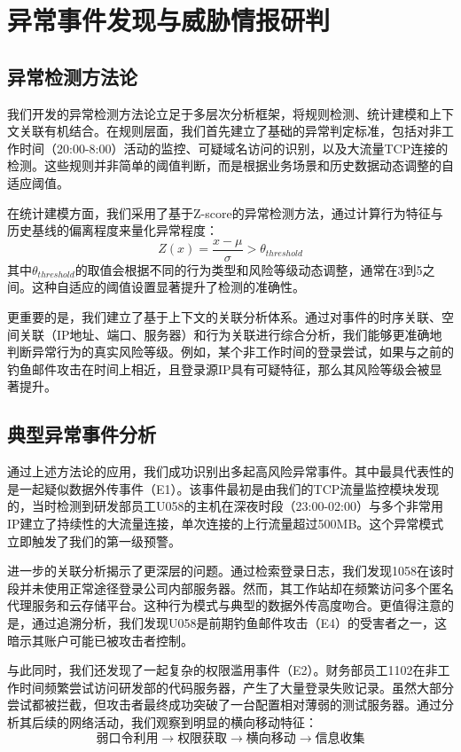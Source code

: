 \documentclass[UTF8,12pt]{ctexart}
\begin{document}
\section{异常事件发现与威胁情报研判}
\subsection{异常检测方法论}
我们开发的异常检测方法论立足于多层次分析框架，将规则检测、统计建模和上下文关联有机结合。在规则层面，我们首先建立了基础的异常判定标准，包括对非工作时间（20:00-8:00）活动的监控、可疑域名访问的识别，以及大流量TCP连接的检测。这些规则并非简单的阈值判断，而是根据业务场景和历史数据动态调整的自适应阈值。

在统计建模方面，我们采用了基于Z-score的异常检测方法，通过计算行为特征与历史基线的偏离程度来量化异常程度：
\begin{equation}
Z(x) = \frac{x - \mu}{\sigma} > \theta_{threshold}
\end{equation}
其中$\theta_{threshold}$的取值会根据不同的行为类型和风险等级动态调整，通常在3到5之间。这种自适应的阈值设置显著提升了检测的准确性。

更重要的是，我们建立了基于上下文的关联分析体系。通过对事件的时序关联、空间关联（IP地址、端口、服务器）和行为关联进行综合分析，我们能够更准确地判断异常行为的真实风险等级。例如，某个非工作时间的登录尝试，如果与之前的钓鱼邮件攻击在时间上相近，且登录源IP具有可疑特征，那么其风险等级会被显著提升。

\subsection{典型异常事件分析}
通过上述方法论的应用，我们成功识别出多起高风险异常事件。其中最具代表性的是一起疑似数据外传事件（E1）。该事件最初是由我们的TCP流量监控模块发现的，当时检测到研发部员工U058的主机在深夜时段（23:00-02:00）与多个非常用IP建立了持续性的大流量连接，单次连接的上行流量超过500MB。这个异常模式立即触发了我们的第一级预警。

进一步的关联分析揭示了更深层的问题。通过检索登录日志，我们发现1058在该时段并未使用正常途径登录公司内部服务器。然而，其工作站却在频繁访问多个匿名代理服务和云存储平台。这种行为模式与典型的数据外传高度吻合。更值得注意的是，通过追溯分析，我们发现U058是前期钓鱼邮件攻击（E4）的受害者之一，这暗示其账户可能已被攻击者控制。

与此同时，我们还发现了一起复杂的权限滥用事件（E2）。财务部员工1102在非工作时间频繁尝试访问研发部的代码服务器，产生了大量登录失败记录。虽然大部分尝试都被拦截，但攻击者最终成功突破了一台配置相对薄弱的测试服务器。通过分析其后续的网络活动，我们观察到明显的横向移动特征：
\begin{equation}
\text{弱口令利用} \rightarrow \text{权限获取} \rightarrow \text{横向移动} \rightarrow \text{信息收集}
\end{equation}
\end{document}

